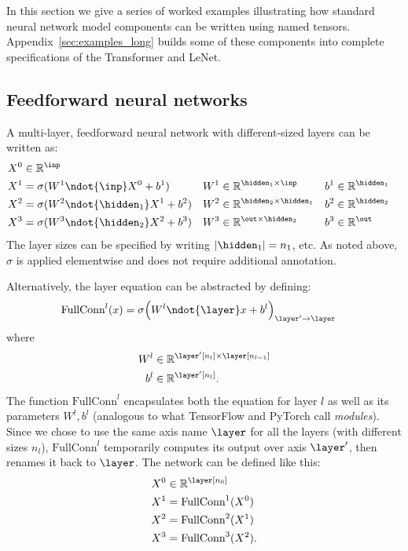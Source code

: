 In this section we give a series of worked examples illustrating how standard neural network model components can be written using named tensors. Appendix~\ref{sec:examples_long} builds some of these components into complete specifications of the Transformer and LeNet.

\subsection{Feedforward neural networks}

A multi-layer, feedforward neural network with different-sized layers can be written as:
\begin{align*}
  X^0 &\in \mathbb{R}^{\inp} \\
  X^1 &= \sigma(W^1 \ndot{\inp} X^0 + b^1) & W^1 &\in \mathbb{R}^{\hidden_1 \times \inp} & b^1 &\in \mathbb{R}^{\hidden_1} \\
  X^2 &= \sigma(W^2 \ndot{\hidden_1} X^1 + b^2) & W^2 &\in \mathbb{R}^{\hidden_2 \times \hidden_1} & b^2 &\in \mathbb{R}^{\hidden_2} \\
  X^3 &= \sigma(W^3 \ndot{\hidden_2} X^2 + b^3) & W^3 &\in \mathbb{R}^{\out \times \hidden_2} & b^3 &\in \mathbb{R}^{\out}
\end{align*}
The layer sizes can be specified by writing $|\hidden_1| = n_1$, etc. As noted above, $\sigma$ is applied elementwise and does not require additional annotation. 

Alternatively, the layer equation can be abstracted by defining:
\begin{align*}
  \text{FullConn}^l(x) &= \sigma\Bigl(W^l \ndot{\layer} x + b^l\Bigr)_{\layer'\rightarrow\layer}
\end{align*}
where
\begin{align*}
  W^l &\in \mathbb{R}^{\layer'[n_l] \times \layer[n_{l-1}]} \\
  b^l &\in \mathbb{R}^{\layer'[n_l]}.
\end{align*}
The function $\text{FullConn}^l$ encapsulates both the equation for layer $l$ as well as its parameters $W^l, b^l$ (analogous to what TensorFlow and PyTorch call \emph{modules}). Since we chose to use the same axis name $\layer$ for all the layers (with different sizes $n_l$), $\text{FullConn}^l$ temporarily computes its output over axis $\layer'$, then renames it back to $\layer$. The network can be defined like this:
\begin{align*}
  X^0 &\in \mathbb{R}^{\layer[n_0]} \\
  X^1 &= \text{FullConn}^1(X^0) \\
  X^2 &= \text{FullConn}^2(X^1) \\
  X^3 &= \text{FullConn}^3(X^2).
\end{align*}

